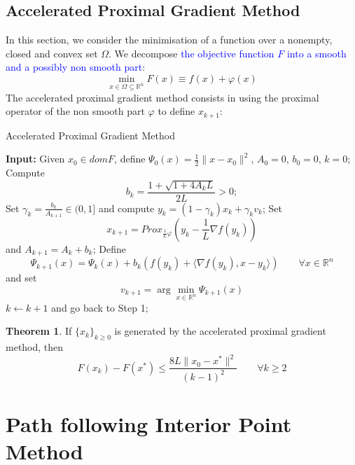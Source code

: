 \documentclass[12pt, openany]{report}
\newcommand{\R}{\mathbb{R}}
\theoremstyle{definition}
\newtheorem{thm}{Theorem}[chapter]
\begin{document}
\section{Accelerated Proximal Gradient Method}
In this section, we consider the minimisation of a function over a nonempty, closed and convex set $\Omega$. We decompose \textcolor{blue}{the objective function $F$ into a smooth and a possibly non smooth part}:
\begin{equation}
	\min_{x \in \Omega\subseteq \R^n} F(x)\equiv f(x) + \varphi(x)
\end{equation}
The accelerated proximal gradient method consists in using the proximal operator of the non smooth part $\varphi$ to define $x_{k+1}$:
\begin{algorithm}
	\caption{Accelerated Proximal Gradient Method}
	\label{alg:APGM}
	\begin{algorithmic}[1]
		\State \textbf{Input:} Given $x_0 \in domF$, define $\Psi_0(x)=\frac{1}{2}\|x-x_0\|^2$, $A_0=0$, $b_0=0$, $k=0$;
		\State Compute 
		\begin{equation}
			b_k = \frac{1+\sqrt{1+4A_kL}}{2L}>0;
		\end{equation}
		\State Set $\gamma_k = \frac{b_k}{A_{k+1}}\in (0,1]$ and compute $y_k = (1-\gamma_k)x_k + \gamma_k v_k$;
		\State Set 
		\begin{equation}
			x_{k+1} = Prox_{\frac{1}{L}\varphi}(y_k - \frac{1}{L}\nabla f(y_k))
		\end{equation}
		and $A_{k+1} = A_k + b_k$;
		\State Define 
		\begin{equation}
			\Psi_{k+1}(x) = \Psi_k(x) + b_k \left(f(y_k)+\langle \nabla f(y_k),x-y_k\rangle \right) \qquad \forall x \in \R^n
		\end{equation}
		and set 
		\begin{equation}
			v_{k+1} = \arg\min_{x \in \R^n} \Psi_{k+1}(x)
		\end{equation}
		\State $k \gets k+1$ and go back to Step 1;
	\end{algorithmic}
\end{algorithm}
\begin{thm}
	If $\{x_k\}_{k\ge0}$ is generated by the accelerated proximal gradient method, then 
	\begin{equation}
		F(x_k) - F(x^*) \le \frac{8L\|x_0-x^*\|^2}{(k-1)^2} \qquad \forall k\ge2 
	\end{equation}
\end{thm}
\chapter{Path following Interior Point Method}
\end{document}
